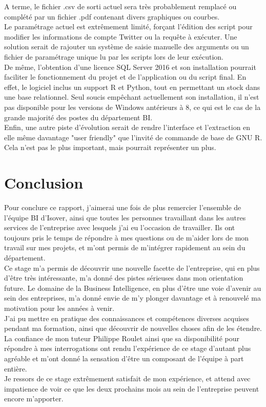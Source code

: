 \documentclass[a4paper,12pt]{article}
\begin{document}
A terme, le fichier .csv de sorti actuel sera très probablement remplacé ou complété par un fichier .pdf contenant divers graphiques ou courbes. \\
Le paramétrage actuel est extrêmement limité, forçant l'édition des script pour modifier les informations de compte Twitter ou la requête à exécuter. Une solution serait de rajouter un système de saisie manuelle des arguments ou un fichier de paramétrage unique lu par les scripts lors de leur exécution.\\

De même, l'obtention d'une licence SQL Server 2016 et son installation pourrait faciliter le fonctionnement du projet et de l'application ou du script final. En effet, le logiciel inclus un support R et Python, tout en permettant un stock dans une base relationnel. Seul soucis empêchant actuellement son installation, il n'est pas disponible pour les versions de Windows antérieurs à 8, ce qui est le cas de la grande majorité des postes du département BI.\\

Enfin, une autre piste d'évolution serait de rendre l'interface et l'extraction en elle même davantage "user friendly" que l'invité de commande de base de GNU R. Cela n'est pas le plus important, mais pourrait représenter un plus.


\newpage
{}
\section*{Conclusion}
Pour conclure ce rapport, j'aimerai une fois de plus remercier l'ensemble de l'équipe BI d'Isover, ainsi que toutes les personnes travaillant dans les autres services de l'entreprise avec lesquels j'ai eu l'occasion de travailler. Ils ont toujours pris le temps de répondre à mes questions ou de m'aider lors de mon travail sur mes projets, et m'ont permis de m'intégrer rapidement au sein du département.\\

Ce stage m'a permis de découvrir une nouvelle facette de l'entreprise, qui en plus d'être très intéressante, m'a donné des pistes sérieuses dans mon orientation future. Le domaine de la Business Intelligence, en plus d'être une voie d'avenir au sein des entreprises, m'a donné envie de m'y plonger davantage et à renouvelé ma motivation pour les années à venir.\\

J'ai pu mettre en pratique des connaissances et compétences diverses acquises pendant ma formation, ainsi que découvrir de nouvelles choses afin de les étendre.\\

La confiance de mon tuteur Philippe Roulet ainsi que sa disponibilité pour répondre à mes interrogations ont rendu l'expérience de ce stage d'autant plus agréable et m'ont donné la sensation d'être un composant de l'équipe à part entière.\\

Je ressors de ce stage extrêmement satisfait de mon expérience, et attend avec impatience de voir ce que les deux prochains mois au sein de l'entreprise peuvent encore m'apporter.
\end{document}
